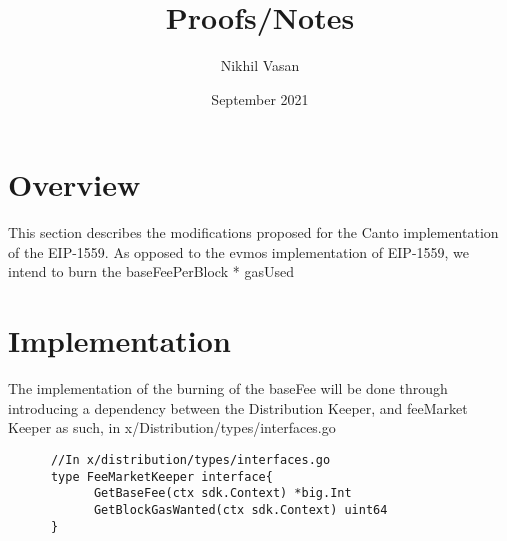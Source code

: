 \documentclass{amsart}
\title{Proofs/Notes}
\author{Nikhil Vasan}
\date{September 2021}
\numberwithin{equation}{section}
\theoremstyle{plain}
\theoremstyle{definition}
\begin{document}
\maketitle
\section{Overview}
This section describes the modifications proposed for the Canto implementation of the EIP-1559. As opposed to the 
evmos implementation of EIP-1559, we intend to burn the baseFeePerBlock * gasUsed 
\section{Implementation}    
The implementation of the burning of the baseFee will be done through introducing a dependency between the Distribution Keeper, and feeMarket Keeper as such, in x/Distribution/types/interfaces.go
\begin{lstlisting}
      //In x/distribution/types/interfaces.go
      type FeeMarketKeeper interface{ 
            GetBaseFee(ctx sdk.Context) *big.Int
            GetBlockGasWanted(ctx sdk.Context) uint64
      }
\end{lstlisting}
\end{document}
